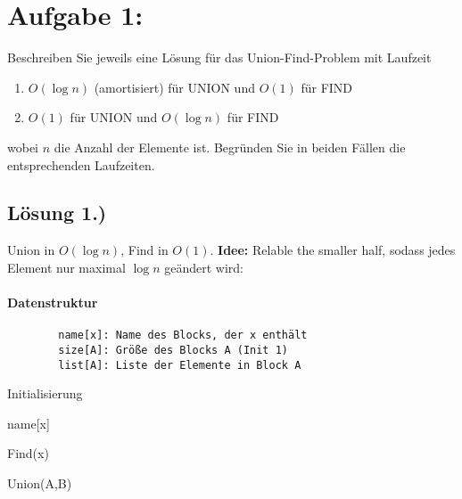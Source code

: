 \section{Aufgabe 1:}
	Beschreiben Sie jeweils eine Lösung für das Union-Find-Problem mit Laufzeit
	\begin{enumerate}
		\item $O(\log n)$ (amortisiert) für UNION und $O(1)$ für FIND
		\item $O(1)$ für UNION und $O(\log n)$ für FIND
	\end{enumerate}	
	wobei $n$ die Anzahl der Elemente ist. Begründen Sie in beiden Fällen die entsprechenden Laufzeiten.

	\subsection*{Lösung 1.)} Union in $ O(\log n) $, Find in $ O(1) $. \textbf{Idee:} Relable the smaller half, sodass jedes Element nur maximal $ \log n $ geändert wird:
	\paragraph{Datenstruktur}
	\begin{verbatim}
	    name[x]: Name des Blocks, der x enthält
	    size[A]: Größe des Blocks A (Init 1)
	    list[A]: Liste der Elemente in Block A
	\end{verbatim}
	
    \begin{algorithm}[H]
    \SetAlgoLined
    \caption{Initialisierung}
    \end{algorithm}
    
    \begin{algorithm}[H]
    \SetAlgoLined
    \Return name[x]\;
    \caption{Find(x)}
    \end{algorithm}
    
    \begin{algorithm}[H]

    \caption{Union(A,B)}
    \end{algorithm}
    
